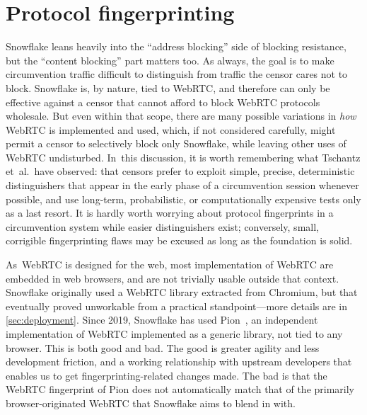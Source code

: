 \documentclass[letterpaper,twocolumn]{article}
\begin{document}
\section{Protocol fingerprinting}
\label{sec:fingerprinting}


Snowflake leans heavily into the ``address blocking'' side of blocking resistance,
but the ``content blocking'' part matters too.
As always, the goal is to make circumvention traffic
difficult to distinguish from traffic the censor cares not to block.
Snowflake is, by nature, tied to WebRTC,
and therefore can only be effective against a censor
that cannot afford to block WebRTC protocols wholesale.
But even within that scope,
there are many possible variations in \emph{how}
WebRTC is implemented and used,
which, if not considered carefully, might permit a censor
to selectively block only Snowflake,
while leaving other uses of WebRTC undisturbed.
In~this discussion, it is worth remembering
what Tschantz et~al.\ have observed\cite[\mbox{VI-A}]{Tschantz2016a}:
that censors prefer to exploit
simple, precise, deterministic distinguishers
that appear in the early phase of a circumvention session whenever possible,
and use long-term, probabilistic, or computationally expensive tests
only as a last resort.
It is hardly worth worrying about protocol fingerprints
in a circumvention system while easier distinguishers exist;
conversely, small, corrigible fingerprinting flaws may be excused
as long as the foundation is solid.

As~WebRTC is designed for the web,
most implementation of WebRTC are embedded in web browsers,
and are not trivially usable outside that context.
Snowflake originally used a WebRTC library extracted from Chromium,
but that eventually proved unworkable from a practical standpoint---more
details are in \autoref{sec:deployment}.
Since 2019, Snowflake has used Pion~\cite{pion-webrtc},
an independent implementation of WebRTC
implemented as a generic library,
not tied to any browser.
This is both good and bad.
The good is greater agility and less development friction,
and a working relationship with upstream developers
that enables us to get fingerprinting-related changes made.
The bad is that the WebRTC fingerprint of Pion
does not automatically match that of the primarily browser-originated
WebRTC that Snowflake aims to blend in with.
\end{document}
